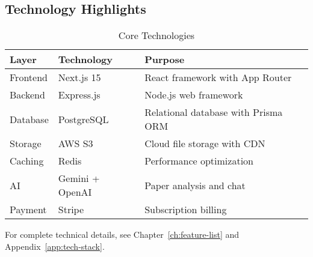 \subsection{Technology Highlights}

\begin{table}[H]
\centering
\caption{Core Technologies}
\label{tab:core-tech}
\begin{tabular}{@{}lll@{}}
\toprule
\textbf{Layer} & \textbf{Technology} & \textbf{Purpose} \\
\midrule
Frontend & Next.js 15 & React framework with App Router \\
Backend & Express.js & Node.js web framework \\
Database & PostgreSQL & Relational database with Prisma ORM \\
Storage & AWS S3 & Cloud file storage with CDN \\
Caching & Redis & Performance optimization \\
AI & Gemini + OpenAI & Paper analysis and chat \\
Payment & Stripe & Subscription billing \\
\bottomrule
\end{tabular}
\end{table}

\vspace{0.5cm}
\noindent
For complete technical details, see Chapter~\ref{ch:feature-list} and Appendix~\ref{app:tech-stack}.
